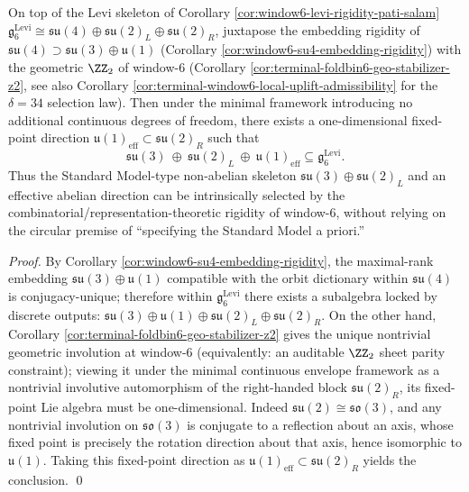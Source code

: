 \begin{corollary}\label{cor:window6-levi-rigidity-sm-residual}
On top of the Levi skeleton of Corollary \ref{cor:window6-levi-rigidity-pati-salam}
\(
\mathfrak g^{\mathrm{Levi}}_6\cong \mathfrak{su}(4)\oplus\mathfrak{su}(2)_L\oplus\mathfrak{su}(2)_R
\),
juxtapose the embedding rigidity of \(\mathfrak{su}(4)\supset \mathfrak{su}(3)\oplus\mathfrak u(1)\) (Corollary \ref{cor:window6-su4-embedding-rigidity})
with the geometric \(\ZZ_2\) of window-\(6\) (Corollary \ref{cor:terminal-foldbin6-geo-stabilizer-z2}, see also Corollary \ref{cor:terminal-window6-local-uplift-admissibility} for the \(\delta=34\) selection law).
Then under the minimal framework introducing no additional continuous degrees of freedom, there exists a one-dimensional fixed-point direction \(\mathfrak u(1)_{\mathrm{eff}}\subset \mathfrak{su}(2)_R\) such that
\[
\mathfrak{su}(3)\ \oplus\ \mathfrak{su}(2)_L\ \oplus\ \mathfrak u(1)_{\mathrm{eff}}
\subseteq \mathfrak g^{\mathrm{Levi}}_6.
\]
Thus the Standard Model-type non-abelian skeleton \(\mathfrak{su}(3)\oplus\mathfrak{su}(2)_L\) and an effective abelian direction can be intrinsically selected by the combinatorial/representation-theoretic rigidity of window-\(6\), without relying on the circular premise of ``specifying the Standard Model a priori.''
\end{corollary}
\begin{proof}
By Corollary \ref{cor:window6-su4-embedding-rigidity}, the maximal-rank embedding \(\mathfrak{su}(3)\oplus\mathfrak u(1)\) compatible with the orbit dictionary within \(\mathfrak{su}(4)\) is conjugacy-unique;
therefore within \(\mathfrak g^{\mathrm{Levi}}_6\) there exists a subalgebra locked by discrete outputs:
\(
\mathfrak{su}(3)\oplus\mathfrak u(1)\oplus\mathfrak{su}(2)_L\oplus\mathfrak{su}(2)_R
\).
On the other hand, Corollary \ref{cor:terminal-foldbin6-geo-stabilizer-z2} gives the unique nontrivial geometric involution at window-\(6\) (equivalently: an auditable \(\ZZ_2\) sheet parity constraint);
viewing it under the minimal continuous envelope framework as a nontrivial involutive automorphism of the right-handed block \(\mathfrak{su}(2)_R\), its fixed-point Lie algebra must be one-dimensional.
Indeed \(\mathfrak{su}(2)\cong\mathfrak{so}(3)\), and any nontrivial involution on \(\mathfrak{so}(3)\) is conjugate to a reflection about an axis, whose fixed point is precisely the rotation direction about that axis, hence isomorphic to \(\mathfrak u(1)\).
Taking this fixed-point direction as \(\mathfrak u(1)_{\mathrm{eff}}\subset \mathfrak{su}(2)_R\) yields the conclusion. \qed
\end{proof}

